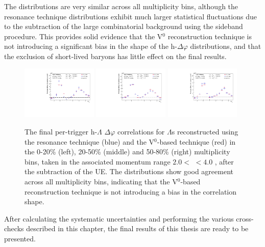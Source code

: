 The distributions are very similar across all multiplicity bins, although the resonance technique distributions exhibit much larger statistical fluctuations due to the subtraction of the large combinatorial background using the sideband procedure. This provides solid evidence that the V$^0$ reconstruction technique is not introducing a significant bias in the shape of the h-\lmb $\Delta\varphi$ distributions, and that the exclusion of short-lived \lmb baryons has little effect on the final results.

\begin{figure}[h!]
    \centering
    \includegraphics[width=0.32\textwidth]{figures/analysis/h_lambda_dphi_0_20_zeroed_rescomp.pdf}
    \includegraphics[width=0.32\textwidth]{figures/analysis/h_lambda_dphi_20_50_zeroed_rescomp.pdf}
    \includegraphics[width=0.32\textwidth]{figures/analysis/h_lambda_dphi_50_80_zeroed_rescomp.pdf}
    \caption{The final per-trigger h-$\Lambda$ $\Delta\varphi$ correlations for $\Lambda$s reconstructed using the resonance technique (blue) and the V$^{0}$-based technique (red) in the 0-20\% (left), 20-50\% (middle) and 50-80\% (right) multiplicity bins, taken in the associated momentum range $2.0 <$ \pt $< 4.0$ \GeVc, after the subtraction of the UE. The distributions show good agreement across all multiplicity bins, indicating that the V$^{0}$-based reconstruction technique is not introducing a bias in the correlation shape.}
    \label{fig:resonance_v0_dphi_comp}
\end{figure}

After calculating the systematic uncertainties and performing the various cross-checks described in this chapter, the final results of this thesis are ready to be presented.

